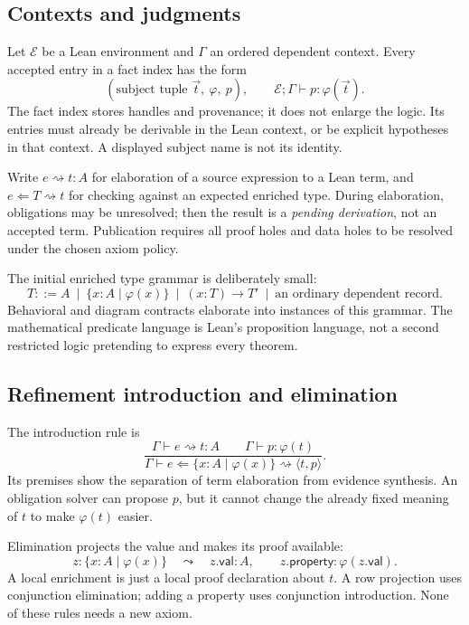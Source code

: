 \documentclass[11pt,a4paper]{article}
\theoremstyle{plain}
\theoremstyle{definition}
\theoremstyle{remark}
\begin{document}
\subsection{Contexts and judgments}
Let $\mathcal E$ be a Lean environment and $\Gamma$ an ordered dependent
context. Every accepted entry in a fact index has the form
\[
  (\text{subject tuple }\vec t,\ \varphi,\ p),\qquad
  \mathcal E;\Gamma\vdash p:\varphi(\vec t).
\]
The fact index stores handles and provenance; it does not enlarge the logic.
Its entries must already be derivable in the Lean context, or be explicit
hypotheses in that context. A displayed subject name is not its identity.

Write $e\rightsquigarrow t:A$ for elaboration of a source expression to a
Lean term, and $e\Leftarrow T\rightsquigarrow t$ for checking against an
expected enriched type. During elaboration, obligations may be unresolved;
then the result is a \emph{pending derivation}, not an accepted term.
Publication requires all proof holes and data holes to be resolved under the
chosen axiom policy.

The initial enriched type grammar is deliberately small:
\[
 T ::= A\ \mid\ \{x:A\mid\varphi(x)\}\ \mid\ (x:T)\to T'
       \ \mid\ \text{an ordinary dependent record}.
\]
Behavioral and diagram contracts elaborate into instances of this grammar.
The mathematical predicate language is Lean's proposition language, not a
second restricted logic pretending to express every theorem.

\subsection{Refinement introduction and elimination}
The introduction rule is
\[
\frac{\Gamma\vdash e\rightsquigarrow t:A\qquad
      \Gamma\vdash p:\varphi(t)}
 {\Gamma\vdash e\Leftarrow\{x:A\mid\varphi(x)\}
       \rightsquigarrow\langle t,p\rangle}.
\]
Its premises show the separation of term elaboration from evidence synthesis.
An obligation solver can propose $p$, but it cannot change the already fixed
meaning of $t$ to make $\varphi(t)$ easier.

Elimination projects the value and makes its proof available:
\[
 z:\{x:A\mid\varphi(x)\}
 \quad\leadsto\quad z.\mathsf{val}:A,
 \qquad z.\mathsf{property}:\varphi(z.\mathsf{val}).
\]
A local enrichment is just a local proof declaration about $t$. A row
projection uses conjunction elimination; adding a property uses conjunction
introduction. None of these rules needs a new axiom.
\end{document}
